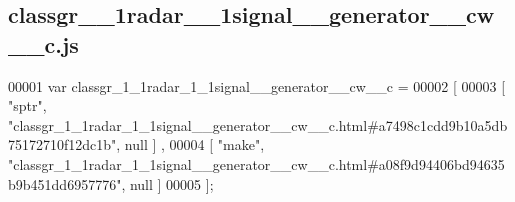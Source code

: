 \subsection{classgr\+\_\+\_\+1radar\+\_\+\_\+1signal\+\_\+\+\_\+generator\+\_\+\+\_\+cw\+\_\+\+\_\+c.\+js}
\label{classgr__1__1radar__1__1signal____generator____cw____c_8js_source}

\begin{DoxyCode}
00001 var classgr_1_1radar_1_1signal__generator__cw__c =
00002 [
00003     [ \textcolor{stringliteral}{"sptr"}, \textcolor{stringliteral}{"classgr\_1\_1radar\_1\_1signal\_\_generator\_\_cw\_\_c.html#a7498c1cdd9b10a5db75172710f12dc1b"}, null ]
      ,
00004     [ \textcolor{stringliteral}{"make"}, \textcolor{stringliteral}{"classgr\_1\_1radar\_1\_1signal\_\_generator\_\_cw\_\_c.html#a08f9d94406bd94635b9b451dd6957776"}, null ]
00005 ];
\end{DoxyCode}
